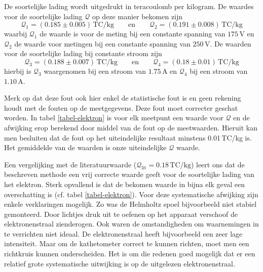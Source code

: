 
De soortelijke lading wordt uitgedrukt in teracoulomb per kilogram. De waardes 
voor de soortelijke lading $\mathcal{Q}$ op deze manier bekomen zijn
$$
\mathcal{Q}_1 = (0.185 \pm 0.005)\,\textrm{TC/kg}
\qquad \textrm{en} \qquad
\mathcal{Q}_2 = (0.191 \pm 0.008)\,\textrm{TC/kg}
$$
waarbij $\mathcal{Q}_1$ de waarde is voor de meting bij een constante spanning 
van $175$\,V en $\mathcal{Q}_2$ de waarde voor metingen bij een constante 
spanning van $250$\,V. De waarden voor de soortelijke lading bij constante 
stroom zijn
$$
\mathcal{Q}_3 = (0.188 \pm 0.007)\,\textrm{TC/kg}
\qquad \textrm{en} \qquad
\mathcal{Q}_4 = (0.18 \pm 0.01)\,\textrm{TC/kg}
$$
hierbij is $\mathcal{Q}_3$ waargenomen bij een stroom van $1.75$\,A en 
$\mathcal{Q}_4$ bij een stroom van $1.10$\,A.

Merk op dat deze fout ook hier enkel de statistische fout is en geen rekening 
houdt met de fouten op de meetgegevens. Deze fout moet correcter geschat 
worden.  In tabel \ref{tabel-elektron} is voor elk meetpunt een waarde voor 
$\mathcal{Q}$ en de afwijking erop berekend door middel van de fout op de 
meetwaarden. Hieruit kan men besluiten dat de fout op het uiteindelijke 
resultaat minstens 0.01\,TC/kg is.  Het gemiddelde van de waarden is onze 
uiteindelijke $\mathcal{Q}$ waarde.
\begin{center}
{\large
{}
}
\end{center}

Een vergelijking met de literatuurwaarde ($\mathcal{Q}_{\textrm{lit}} = 
0.18\,\textrm{TC/kg}$) leert ons dat de beschreven methode een vrij correcte 
waarde geeft voor de soortelijke lading van het elektron. Sterk opvallend is 
dat de bekomen waarde in bijna elk geval een overschatting is (cf. tabel 
\ref{tabel-elektron}).
Voor deze systematische afwijking zijn enkele verklaringen mogelijk. Zo was de 
Helmholtz spoel bijvoorbeeld niet stabiel gemonteerd. Door lichtjes druk uit te 
oefenen op het apparaat verschoof de elektronenstraal zienderogen. Ook waren de 
omstandigheden om waarnemingen in te verrichten niet ideaal. De 
elektronenstraal heeft bijvoorbeeld een zeer lage intensiteit. Maar om de 
kathetometer correct te kunnen richten, moet men een richtkruis kunnen 
onderscheiden. Het is om die redenen goed mogelijk dat er een relatief grote 
systematische uitwijking is op de uitgelezen elektronenstraal.
